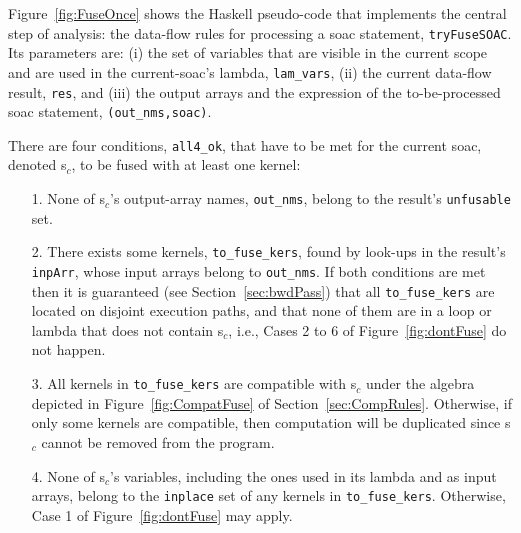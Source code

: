 \documentclass{sigplanconf}  %
\newcommand{\emp}[1]{\textcolor{DikuRed}{ #1}}
\begin{document}



\enlargethispage{\baselineskip}


Figure~\ref{fig:FuseOnce} shows %
the Haskell pseudo-code that implements the central step of
analysis: the data-flow rules for processing a {\sc soac} statement, 
\emp{\tt tryFuseSOAC}. 
%
Its parameters are: (i) the set of variables
that are visible in the current scope and are used in the current-{\sc soac}'s
lambda, {\tt lam\_vars}, (ii) the current data-flow result, {\tt res}, and
(iii) the output arrays and the expression of the to-be-processed 
{\sc soac} statement, {\tt (out\_nms,soac)}.  

There are four conditions, {\tt all4\_ok}, that have to be met for the 
current {\sc soac}, denoted {\sc s}$_c$, to be fused with at least one kernel: %
\begin{itemize}
    \item [1.] None of {\sc s}$_c$'s output-array names, {\tt out\_nms}, 
                belong to the result's {\tt unfusable} set.
    \item [2.] There exists some kernels, {\tt to\_fuse\_kers}, found by look-ups
                in the result's {\tt inpArr}, whose input arrays belong to {\tt out\_nms}.
                If both conditions are met then it is guaranteed (see Section~\ref{sec:bwdPass}) 
                that all {\tt to\_fuse\_kers} are located on disjoint execution paths,
                and that none of them are in a loop or lambda 
                that does not contain {\sc s}$_c$, 
                i.e., \emp{Cases 2 to 6} of Figure~\ref{fig:dontFuse} do not happen.
    \item [3.] All kernels in {\tt to\_fuse\_kers} are compatible with 
                    {\sc s}$_c$ under the algebra depicted 
                    in Figure~\ref{fig:CompatFuse} of Section~\ref{sec:CompRules}. 
               Otherwise, if only some kernels are compatible, then computation
                will be duplicated since {\sc s}$_c$ cannot be removed
                from the program.
    \item [4.] None of {\sc s}$_c$'s variables, including the
                ones used in its lambda and as input arrays, belong to the 
                {\tt inplace} set of any kernels in {\tt to\_fuse\_kers}.
                Otherwise, \emp{Case 1} of Figure~\ref{fig:dontFuse} may apply.
\end{itemize}
\end{document}
